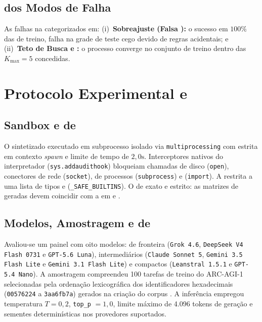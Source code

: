 \documentclass[letterpaper]{article} %
\begin{document}
\subsection{\Classificacao{} dos Modos de Falha}
As falhas na \sintese{} \sao{} categorizados em:
(i)~\textbf{Sobreajuste \Espurio{} (Falsa \Convergencia{}):} o \codigo{} \obtem{} sucesso em $100\%$ das \demonstracoes{} de treino, \porem{} falha na grade de teste cego devido \a{} \absorcao{} de regras acidentais; e
(ii)~\textbf{Teto de Busca e \Representacao{}:} o processo \nao{} converge no conjunto de treino dentro das $K_{\max} = 5$ \iteracoes{} concedidas.




\section{Protocolo Experimental e \Execucao{}}
\label{sec:experimento}

\subsection{Sandbox e \Seguranca{} de \Execucao{}}
O \codigo{} sintetizado \e{} executado em subprocesso isolado via \texttt{multiprocessing} com \inicializacao{} estrita em contexto \textit{spawn} e limite de tempo de $2{,}0\text{s}$. Interceptores nativos do interpretador (\texttt{sys.addaudithook}) bloqueiam chamadas de disco (\texttt{open}), conectores de rede (\texttt{socket}), \criacao{} de processos (\texttt{subprocess}) e \importacoes{} (\texttt{import}). A \execucao{} \e{} restrita a uma lista de tipos e \funcoes{} (\texttt{\_SAFE\_BUILTINS}). O \criterio{} de \validacao{} \e{} exato e estrito: as matrizes de \saida{} geradas devem coincidir com a  em \dimensao{} e .

\subsection{Modelos, Amostragem e \Parametros{} de \Inferencia{}}
Avaliou-se um painel com oito modelos: de fronteira (\texttt{Grok 4.6}, \texttt{DeepSeek V4 Flash 0731} e \texttt{GPT-5.6 Luna}), intermedi{\'{a}}rios (\texttt{Claude Sonnet 5}, \texttt{Gemini 3.5 Flash Lite} e \texttt{Gemini 3.1 Flash Lite}) e compactos (\texttt{Leanstral 1.5.1} e \texttt{GPT-5.4 Nano}). A amostragem compreendeu 100 tarefas de treino do ARC-AGI-1 selecionadas pela ordena{\c{c}}{\~a}o lexicogr{\'{a}}fica dos identificadores hexadecimais (\texttt{00576224} a \texttt{3aa6fb7a}) gerados na cria{\c{c}}{\~a}o do corpus \cite{chollet2019measure}. A infer{\^{e}}ncia empregou temperatura $T = 0{,}2$, \texttt{top\_p} $= 1{,}0$, limite m{\'{a}}ximo de 4.096 tokens de gera{\c{c}}{\~a}o e sementes determin{\'{i}}sticas nos provedores suportados.
\end{document}
